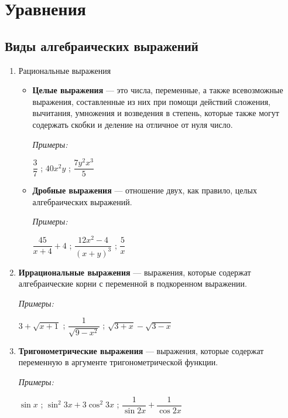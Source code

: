 \documentclass[12pt, a4paper]{article}
\begin{document}
	

\section*{Уравнения}

\subsection*{Виды алгебраических выражений}

\begin{enumerate}
	\item Рациональные выражения
	\begin{itemize}
		\item \textbf{Целые выражения} — это числа, переменные, а также всевозможные выражения, составленные из них при помощи действий сложения, вычитания, умножения и возведения в степень, которые также могут содержать скобки и деление на отличное от нуля число.
		
		\textit{Примеры:}
		\begin{center}
			$\dfrac{3}{7}$ ; $40x^2y$ ; $\dfrac{7y^2x^3}{5}$
		\end{center}
		\item \textbf{Дробные выражения} — отношение двух, как правило, целых алгебраических выражений.
	
		\textit{Примеры:}
		\begin{center}
			$\dfrac{45}{x+4}+4$ ; $\dfrac{12x^2-4}{(x+y)^3}$ ; $\dfrac{5}{x}$
		\end{center}
	\end{itemize}
	\item \textbf{Иррациональные выражения} — выражения, которые содержат алгебраические корни с переменной в подкоренном выражении.
	
	\textit{Примеры:}
	\begin{center}
		$3+\sqrt{x+1}$ ; $\dfrac{1}{\sqrt{9-x^2}}$ ; $\sqrt{3+x}-\sqrt{3-x}$
	\end{center}
	
	\item \textbf{Тригонометрические выражения} — выражения, которые содержат переменную в аргументе тригонометрической функции.
	
	\textit{Примеры:}
	\begin{center}
		$\sin{x}$ ; $\sin^2{3x}+3\cos^2{3x}$ ; $\dfrac{1}{\sin{2x}}+\dfrac{1}{\cos{2x}}$
	\end{center}


\end{enumerate}
\end{document}
